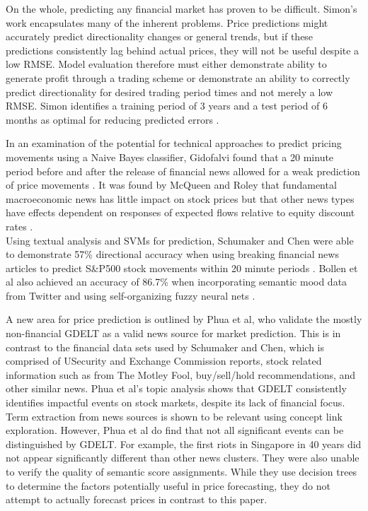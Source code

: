 On the whole, predicting any financial market has proven to be difficult. Simon's work encapsulates many of the inherent problems. Price predictions might accurately predict directionality changes or general trends, but if these predictions consistently lag behind actual prices, they will not be useful despite a low RMSE. Model evaluation therefore must either demonstrate ability to generate profit through a trading scheme or demonstrate an ability to correctly predict directionality for desired trading period times and not merely a low RMSE. Simon identifies a training period of 3 years and a test period of 6 months as optimal for reducing predicted errors \cite{forex_neuralnets}.

\noindent In an examination of the potential for technical approaches to predict pricing movements using a Naive Bayes classifier, Gidofalvi found that a 20 minute period before and after the release of financial news allowed for a weak prediction of price movements \cite{gidofalvi2001using}. It was found by McQueen and Roley that fundamental macroeconomic news has little impact on stock prices but that other news types have effects dependent on responses of expected flows relative to equity discount rates \cite{mcqueen1993stock}.\\

\noindent Using textual analysis and SVMs for prediction, Schumaker and Chen were able to demonstrate 57\% directional accuracy when using breaking financial news articles to predict S\&P500 stock movements within 20 minute periods \cite{schumaker2009textual}. Bollen et al also achieved an accuracy of 86.7\% when incorporating semantic mood data from Twitter and using self-organizing fuzzy neural nets \cite{bollen2011twitter}.

\noindent A new area for price prediction is outlined by Phua et al, who validate the mostly non-financial GDELT as a valid news source for market prediction. This is in contrast to the financial data sets used by Schumaker and Chen, which is comprised of USecurity and Exchange Commission reports, stock related information such as from The Motley Fool, buy/sell/hold recommendations, and other similar news. Phua et al's topic analysis shows that GDELT consistently identifies impactful events on stock markets, despite its lack of financial focus. Term extraction from news sources is shown to be relevant using concept link exploration. However, Phua et al do find that not all significant events can be distinguished by GDELT. For example, the first riots in Singapore in 40 years did not appear significantly different than other news clusters. They were also unable to verify the quality of semantic score assignments. While they use decision trees to determine the factors potentially useful in price forecasting, they do not attempt to actually forecast prices in contrast to this paper.